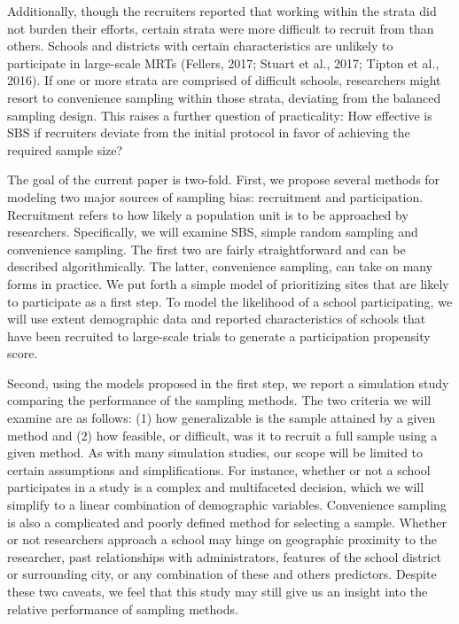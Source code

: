 \documentclass[man,floatsintext]{apa6}
\begin{document}
Additionally, though the recruiters reported that working within the strata did not burden their efforts, certain strata were more difficult to recruit from than others. Schools and districts with certain characteristics are unlikely to participate in large-scale MRTs (Fellers, 2017; Stuart et al., 2017; Tipton et al., 2016). If one or more strata are comprised of difficult schools, researchers might resort to convenience sampling within those strata, deviating from the balanced sampling design. This raises a further question of practicality: How effective is SBS if recruiters deviate from the initial protocol in favor of achieving the required sample size?

The goal of the current paper is two-fold. First, we propose several methods for modeling two major sources of sampling bias: recruitment and participation. Recruitment refers to how likely a population unit is to be approached by researchers. Specifically, we will examine SBS, simple random sampling and convenience sampling. The first two are fairly straightforward and can be described algorithmically. The latter, convenience sampling, can take on many forms in practice. We put forth a simple model of prioritizing sites that are likely to participate as a first step. To model the likelihood of a school participating, we will use extent demographic data and reported characteristics of schools that have been recruited to large-scale trials to generate a participation propensity score.

Second, using the models proposed in the first step, we report a simulation study comparing the performance of the sampling methods. The two criteria we will examine are as follows: (1) how generalizable is the sample attained by a given method and (2) how feasible, or difficult, was it to recruit a full sample using a given method. As with many simulation studies, our scope will be limited to certain assumptions and simplifications. For instance, whether or not a school participates in a study is a complex and multifaceted decision, which we will simplify to a linear combination of demographic variables. Convenience sampling is also a complicated and poorly defined method for selecting a sample. Whether or not researchers approach a school may hinge on geographic proximity to the researcher, past relationships with administrators, features of the school district or surrounding city, or any combination of these and others predictors. Despite these two caveats, we feel that this study may still give us an insight into the relative performance of sampling methods.
\end{document}
